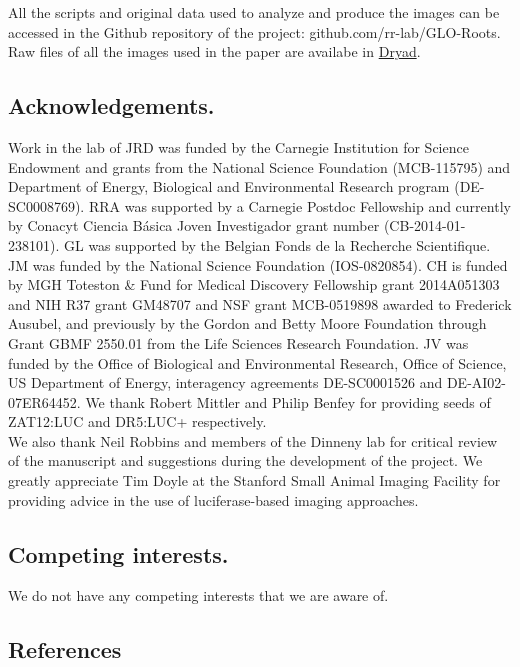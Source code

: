 \documentclass[]{article}
\begin{document}
All the scripts and original data used to analyze and produce the images
can be accessed in the Github repository of the project:
github.com/rr-lab/GLO-Roots. Raw files of all the images used in the
paper are availabe in
\href{http://datadryad.org/review?doi=doi:10.5061/dryad.4k37q}{Dryad}.

\subsection{Acknowledgements.}\label{acknowledgements.}

Work in the lab of JRD was funded by the Carnegie Institution for
Science Endowment and grants from the National Science Foundation
(MCB-115795) and Department of Energy, Biological and Environmental
Research program (DE-SC0008769). RRA was supported by a Carnegie Postdoc
Fellowship and currently by Conacyt Ciencia Básica Joven Investigador
grant number (CB-2014-01-238101). GL was supported by the Belgian Fonds
de la Recherche Scientifique. JM was funded by the National Science
Foundation (IOS-0820854). CH is funded by MGH Toteston \& Fund for
Medical Discovery Fellowship grant 2014A051303 and NIH R37 grant GM48707
and NSF grant MCB-0519898 awarded to Frederick Ausubel, and previously
by the Gordon and Betty Moore Foundation through Grant GBMF 2550.01 from
the Life Sciences Research Foundation. JV was funded by the Office of
Biological and Environmental Research, Office of Science, US Department
of Energy, interagency agreements DE-SC0001526 and DE-AI02-07ER64452. We
thank Robert Mittler and Philip Benfey for providing seeds of ZAT12:LUC
and DR5:LUC+ respectively.\\We also thank Neil Robbins and members of
the Dinneny lab for critical review of the manuscript and suggestions
during the development of the project. We greatly appreciate Tim Doyle
at the Stanford Small Animal Imaging Facility for providing advice in
the use of luciferase-based imaging approaches.

\subsection{Competing interests.}\label{competing-interests.}

We do not have any competing interests that we are aware of.

\pagebreak

\subsection*{References}\label{references}
\end{document}
